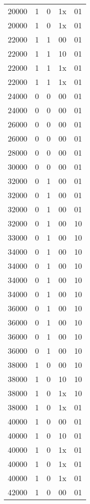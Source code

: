 \documentclass[paper=usletter, fontsize=12pt]{article}
\begin{document}
\begin{longtable*}{@{\extracolsep{\fill}} ccccc}
        20000 & 1 & 0 & 1x & 01 \\
        20000 & 1 & 0 & 1x & 01 \\
        22000 & 1 & 1 & 00 & 01 \\
        22000 & 1 & 1 & 10 & 01 \\
        22000 & 1 & 1 & 1x & 01 \\
        22000 & 1 & 1 & 1x & 01 \\
        24000 & 0 & 0 & 00 & 01 \\
        24000 & 0 & 0 & 00 & 01 \\
        26000 & 0 & 0 & 00 & 01 \\
        26000 & 0 & 0 & 00 & 01 \\
        28000 & 0 & 0 & 00 & 01 \\
        30000 & 0 & 0 & 00 & 01 \\
        32000 & 0 & 1 & 00 & 01 \\
        32000 & 0 & 1 & 00 & 01 \\
        32000 & 0 & 1 & 00 & 01 \\
        32000 & 0 & 1 & 00 & 10 \\
        33000 & 0 & 1 & 00 & 10 \\
        34000 & 0 & 1 & 00 & 10 \\
        34000 & 0 & 1 & 00 & 10 \\
        34000 & 0 & 1 & 00 & 10 \\
        34000 & 0 & 1 & 00 & 10 \\
        36000 & 0 & 1 & 00 & 10 \\
        36000 & 0 & 1 & 00 & 10 \\
        36000 & 0 & 1 & 00 & 10 \\
        36000 & 0 & 1 & 00 & 10 \\
        38000 & 1 & 0 & 00 & 10 \\
        38000 & 1 & 0 & 10 & 10 \\
        38000 & 1 & 0 & 1x & 10 \\
        38000 & 1 & 0 & 1x & 01 \\
        40000 & 1 & 0 & 00 & 01 \\
        40000 & 1 & 0 & 10 & 01 \\
        40000 & 1 & 0 & 1x & 01 \\
        40000 & 1 & 0 & 1x & 01 \\
        40000 & 1 & 0 & 1x & 01 \\
        42000 & 1 & 0 & 00 & 01 \\

\end{longtable*}
\end{document}
